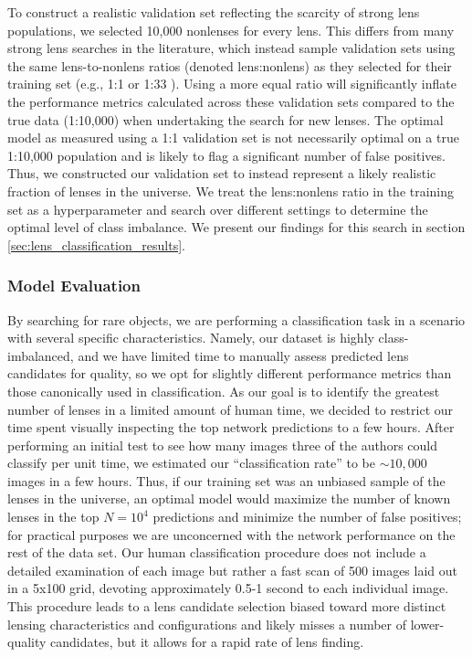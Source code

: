 \documentclass{aastex631}
\begin{document}
To construct a realistic validation set reflecting the scarcity of strong lens populations, we selected 10,000 nonlenses for every lens. This differs from many strong lens searches in the literature, which instead sample validation sets using the same lens-to-nonlens ratios (denoted lens:nonlens) as they selected for their training set (e.g., 1:1 \citep{JacobsIII} or 1:33 \citep{HuangI}). Using a more equal ratio will significantly inflate the performance metrics calculated across these validation sets compared to the true data (1:10,000) when undertaking the search for new lenses. The optimal model as measured using a 1:1 validation set is not necessarily optimal on a true 1:10,000 population and is likely to flag a significant number of false positives. Thus, we constructed our validation set to instead represent a likely realistic fraction of lenses in the universe. We treat the lens:nonlens ratio in the training set as a hyperparameter and search over different settings to determine the optimal level of class imbalance. We present our findings for this search in section \ref{sec:lens_classification_results}.

\subsubsection{Model Evaluation}

By searching for rare objects, we are performing a classification task in a scenario with several specific characteristics. Namely, our dataset is highly class-imbalanced, and we have limited time to manually assess predicted lens candidates for quality, so we opt for slightly different performance metrics than those canonically used in classification. As our goal is to identify the greatest number of lenses in a limited amount of human time, we decided to restrict our time spent visually inspecting the top network predictions to a few hours. After performing an initial test to see how many images three of the authors could classify per unit time, we estimated our ``classification rate'' to be $\sim10,000$ images in a few hours. Thus, if our training set was an unbiased sample of the lenses in the universe, an optimal model would maximize the number of known lenses in the top $N=10^4$ predictions and minimize the number of false positives; for practical purposes we are unconcerned with the network performance on the rest of the data set. Our human classification procedure does not include a detailed examination of each image but rather a fast scan of 500 images laid out in a 5x100 grid, devoting approximately 0.5-1 second to each individual image. This procedure leads to a lens candidate selection biased toward more distinct lensing characteristics and configurations and likely misses a number of lower-quality candidates, but it allows for a rapid rate of lens finding. 
\end{document}
